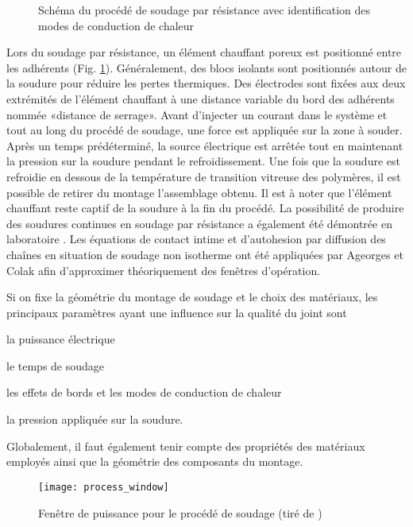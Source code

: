 \begin{figure}[t]
	\centering
	
	\caption{Schéma du procédé de soudage par résistance avec identification des modes de conduction de chaleur}
	\label{fig:schema_soudage_resistance}
\end{figure}

Lors du soudage par résistance, un élément chauffant poreux est positionné entre les adhérents (Fig. \ref{fig:schema_soudage_resistance}). 
Généralement, des blocs isolants sont positionnés autour de la soudure pour réduire les pertes thermiques. 
Des électrodes sont fixées aux deux extrémités de l'élément chauffant à une distance variable du bord des adhérents nommée «distance de serrage». 
Avant d'injecter un courant dans le système et tout au long du procédé de soudage, une force est appliquée sur la zone à souder. 
Après un temps prédéterminé, la source électrique est arrêtée tout en maintenant la pression sur la soudure pendant le refroidissement. 
Une fois que la soudure est refroidie en dessous de la température de transition vitreuse des polymères, il est possible de retirer du montage l'assemblage obtenu. 
Il est à noter que l'élément chauffant reste captif de la soudure à la fin du procédé. 
La possibilité de produire des soudures continues en soudage par résistance a également été démontrée en laboratoire \cite{Shi2015a}. 
Les équations de contact intime et d'autohesion par diffusion des chaînes en situation de soudage non isotherme ont été appliquées par Ageorges \cite{Ageorges1998} et Colak \cite{Colak2002} afin d'approximer théoriquement des fenêtres d'opération. 

Si on fixe la géométrie du montage de soudage et le choix des matériaux, les principaux paramètres ayant une influence sur la qualité du joint sont 
\begin{inparaenum}[(1)]
	\item la puissance électrique
	\item le temps de soudage
	\item les effets de bords et les modes de conduction de chaleur
	\item la pression appliquée sur la soudure. 
\end{inparaenum}
Globalement, il faut également tenir compte des propriétés des matériaux employés ainsi que la géométrie des composants du montage. 

\begin{figure}[]
	\centering
	\texttt{[image: process\_window]}
	\caption{Fenêtre de puissance pour le procédé de soudage (tiré de \cite{Hou2001})}
	\label{fig:process_window}
\end{figure}

